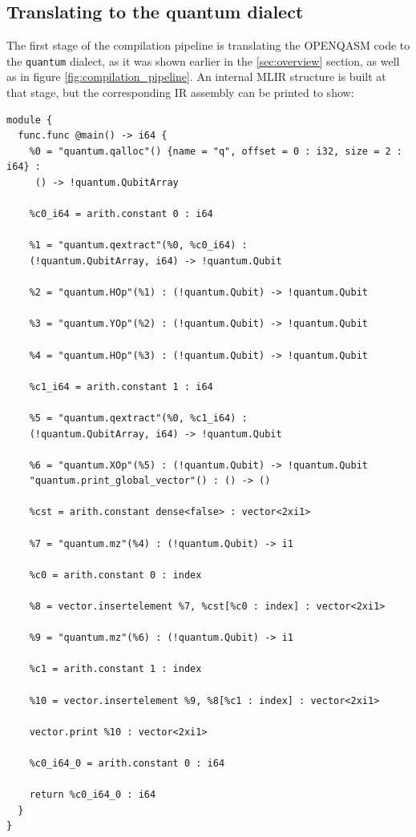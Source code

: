 \subsection{Translating to the quantum dialect}
The first stage of the compilation pipeline is translating the OPENQASM code to the \texttt{quantum} dialect, 
as it was shown earlier in the \ref{sec:overview} section, as well as in figure \ref{fig:compilation_pipeline}. 
An internal MLIR structure is built at that stage, but the corresponding IR assembly can be printed to show:
\begin{verbatim}
module {
  func.func @main() -> i64 {
    %0 = "quantum.qalloc"() {name = "q", offset = 0 : i32, size = 2 : i64} :
     () -> !quantum.QubitArray

    %c0_i64 = arith.constant 0 : i64
    
    %1 = "quantum.qextract"(%0, %c0_i64) : 
    (!quantum.QubitArray, i64) -> !quantum.Qubit

    %2 = "quantum.HOp"(%1) : (!quantum.Qubit) -> !quantum.Qubit

    %3 = "quantum.YOp"(%2) : (!quantum.Qubit) -> !quantum.Qubit
    
    %4 = "quantum.HOp"(%3) : (!quantum.Qubit) -> !quantum.Qubit

    %c1_i64 = arith.constant 1 : i64

    %5 = "quantum.qextract"(%0, %c1_i64) : 
    (!quantum.QubitArray, i64) -> !quantum.Qubit

    %6 = "quantum.XOp"(%5) : (!quantum.Qubit) -> !quantum.Qubit
    "quantum.print_global_vector"() : () -> ()

    %cst = arith.constant dense<false> : vector<2xi1>

    %7 = "quantum.mz"(%4) : (!quantum.Qubit) -> i1

    %c0 = arith.constant 0 : index

    %8 = vector.insertelement %7, %cst[%c0 : index] : vector<2xi1>

    %9 = "quantum.mz"(%6) : (!quantum.Qubit) -> i1

    %c1 = arith.constant 1 : index

    %10 = vector.insertelement %9, %8[%c1 : index] : vector<2xi1>

    vector.print %10 : vector<2xi1>

    %c0_i64_0 = arith.constant 0 : i64

    return %c0_i64_0 : i64
  }
}

\end{verbatim}
